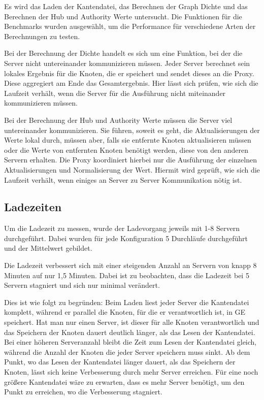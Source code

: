 Es wird das Laden der Kantendatei, das Berechnen der Graph Dichte und das Berechnen der Hub und Authority Werte untersucht. Die Funktionen für die Benchmarks wurden ausgewählt, um die Performance für verschiedene Arten der Berechnungen zu testen.

Bei der Berechnung der Dichte handelt es sich um eine Funktion, bei der die Server nicht untereinander kommunizieren müssen. Jeder Server berechnet sein lokales Ergebnis für die Knoten, die er speichert und sendet dieses an die Proxy. 
Diese aggregiert am Ende das Gesamtergebnis. Hier lässt sich prüfen, wie sich die Laufzeit verhält, wenn die Server für die Ausführung nicht miteinander kommunizieren müssen.

Bei der Berechnung der Hub und Authority Werte müssen die Server viel untereinander kommunizieren. Sie führen, soweit es geht, die Aktualisierungen der Werte lokal durch, müssen aber, falls sie entfernte Knoten aktualisieren müssen oder die Werte von entfernten Knoten benötigt werden, diese von den anderen Servern erhalten.
Die Proxy koordiniert hierbei nur die Ausführung der einzelnen Aktualisierungen und Normalisierung der Wert. Hiermit wird geprüft, wie sich die Laufzeit verhält, wenn einiges an Server zu Server Kommunikation nötig ist.


\subsection{Ladezeiten}

Um die Ladezeit zu messen, wurde der Ladevorgang jeweils mit 1-8 Servern durchgeführt. Dabei wurden für jede Konfiguration 5 Durchläufe durchgeführt und der Mittelwert gebildet.

Die Ladezeit verbessert sich mit einer steigenden Anzahl an Servern von knapp 8 Minuten auf nur 1,5 Minuten. Dabei ist zu beobachten, dass die Ladezeit bei 5 Servern stagniert und sich nur minimal verändert.

Dies ist wie folgt zu begründen: Beim Laden liest jeder Server die Kantendatei komplett, während er parallel die Knoten, für die er verantwortlich ist, in GE speichert. Hat man nur einen Server, ist dieser für alle Knoten verantwortlich
und das Speichern der Knoten dauert deutlich länger, als das Lesen der Kantendatei. Bei einer höheren Serveranzahl bleibt die Zeit zum Lesen der Kantendatei gleich, während die Anzahl der Knoten die jeder Server speichern muss sinkt.
Ab dem Punkt, wo das Lesen der Kantendatei länger dauert, als das Speichern der Knoten, lässt sich keine Verbesserung durch mehr Server erreichen. Für eine noch größere Kantendatei wäre zu erwarten, dass es mehr Server benötigt, um den Punkt zu erreichen, wo die Verbesserung stagniert.

